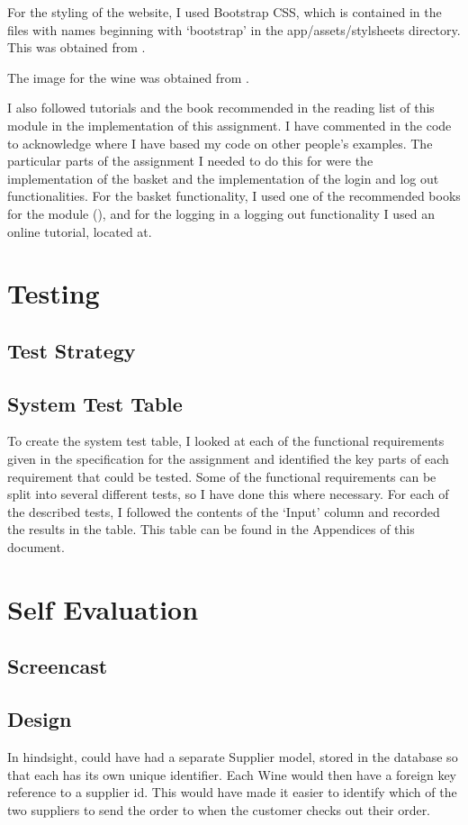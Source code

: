\documentclass[a4paper,12pt,hidelinks]{report}
\begin{document}
    For the styling of the website, I used Bootstrap CSS, which is contained in the files with names beginning with `bootstrap' in the app/assets/stylsheets
    directory. This was obtained from \cite{bootstrap}.

    The image for the wine was obtained from \cite{wine-image}.

    I also followed tutorials and the book recommended in the reading list of this module in the implementation of this assignment. I have 
    commented in the code to acknowledge where I have based my code on other people's examples. The particular parts of the assignment I
    needed to do this for were the implementation of the basket and the implementation of the login and log out functionalities. For the
    basket functionality, I used one of the recommended books for the module (\cite{agile-web-dev}), and for the logging in a logging out functionality
    I used an online tutorial, located at\cite{online-ruby-book}.



\chapter{Testing}
    \section{Test Strategy}
    \section{System Test Table}
    To create the system test table, I looked at each of the functional requirements given in the specification for the
    assignment and identified the key parts of each requirement that could be tested. Some of the functional requirements can
    be split into several different tests, so I have done this where necessary. For each of the described tests, I followed the contents
    of the `Input' column and recorded the results in the table. This table can be found in the Appendices of this document.

\chapter{Self Evaluation}
    \section{Screencast}
    \section{Design}
    In hindsight, could have had a separate Supplier model, stored in the database so that each has its own unique identifier. Each Wine would
    then have a foreign key reference to a supplier id. This would have made it easier to identify which of the two suppliers to send the 
    order to when the customer checks out their order.
\end{document}
